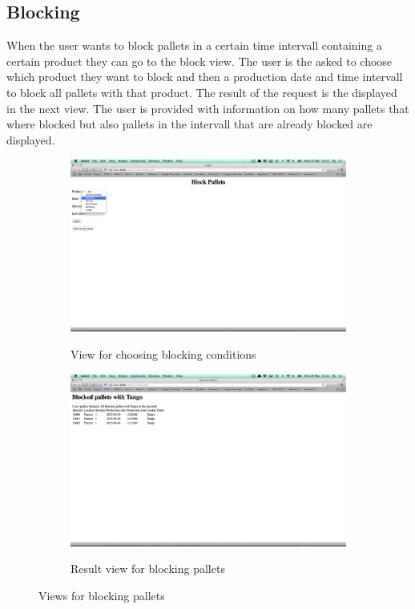 \documentclass[a4paper]{scrartcl}
\numberwithin{equation}{section}
\begin{document}
\subsection*{Blocking}

When the user wants to block pallets in a certain time intervall containing a certain product they can go to the block view. The user is the asked to choose which product they want to block and then a production date and time intervall to block all pallets with that product. The result of the request is the displayed in the next view. The user is provided with information on how many pallets that where blocked but also pallets in the intervall that are already blocked are displayed.

\begin{figure}[h]
  \centering
  	\begin{subfigure}[b]{0.45\textwidth}
    	\includegraphics[width=\textwidth]{figures/view_block.png}
    	\label{figure:view_block}
    	\caption{View for choosing blocking conditions}
 		\end{subfigure}	
 		\begin{subfigure}[b]{0.45\textwidth}
    	\includegraphics[width=\textwidth]{figures/view_blockResult.png}
    	\label{figure:view_blockResult}
    	\caption{Result view for blocking pallets}
 		\end{subfigure} 
 		\caption{Views for blocking pallets}
\end{figure}
\end{document}
